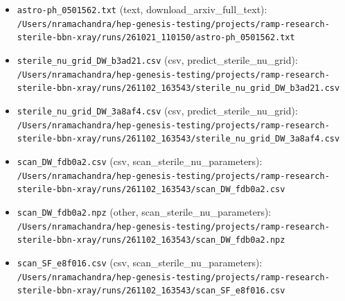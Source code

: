 \documentclass[11pt,a4paper]{article}
\begin{document}
\begin{itemize}
  \item \texttt{astro-ph\_\allowbreak{}0501562.txt} (text, download\_arxiv\_full\_text): \texttt{/\allowbreak{}Users/\allowbreak{}nramachandra/\allowbreak{}hep-genesis-testing/\allowbreak{}projects/\allowbreak{}ramp-research-sterile-bbn-xray/\allowbreak{}runs/\allowbreak{}261021\_\allowbreak{}110150/\allowbreak{}astro-ph\_\allowbreak{}0501562.txt}
  \item \texttt{sterile\_\allowbreak{}nu\_\allowbreak{}grid\_\allowbreak{}DW\_\allowbreak{}b3ad21.csv} (csv, predict\_sterile\_nu\_grid): \texttt{/\allowbreak{}Users/\allowbreak{}nramachandra/\allowbreak{}hep-genesis-testing/\allowbreak{}projects/\allowbreak{}ramp-research-sterile-bbn-xray/\allowbreak{}runs/\allowbreak{}261102\_\allowbreak{}163543/\allowbreak{}sterile\_\allowbreak{}nu\_\allowbreak{}grid\_\allowbreak{}DW\_\allowbreak{}b3ad21.csv}
  \item \texttt{sterile\_\allowbreak{}nu\_\allowbreak{}grid\_\allowbreak{}DW\_\allowbreak{}3a8af4.csv} (csv, predict\_sterile\_nu\_grid): \texttt{/\allowbreak{}Users/\allowbreak{}nramachandra/\allowbreak{}hep-genesis-testing/\allowbreak{}projects/\allowbreak{}ramp-research-sterile-bbn-xray/\allowbreak{}runs/\allowbreak{}261102\_\allowbreak{}163543/\allowbreak{}sterile\_\allowbreak{}nu\_\allowbreak{}grid\_\allowbreak{}DW\_\allowbreak{}3a8af4.csv}
  \item \texttt{scan\_\allowbreak{}DW\_\allowbreak{}fdb0a2.csv} (csv, scan\_sterile\_nu\_parameters): \texttt{/\allowbreak{}Users/\allowbreak{}nramachandra/\allowbreak{}hep-genesis-testing/\allowbreak{}projects/\allowbreak{}ramp-research-sterile-bbn-xray/\allowbreak{}runs/\allowbreak{}261102\_\allowbreak{}163543/\allowbreak{}scan\_\allowbreak{}DW\_\allowbreak{}fdb0a2.csv}
  \item \texttt{scan\_\allowbreak{}DW\_\allowbreak{}fdb0a2.npz} (other, scan\_sterile\_nu\_parameters): \texttt{/\allowbreak{}Users/\allowbreak{}nramachandra/\allowbreak{}hep-genesis-testing/\allowbreak{}projects/\allowbreak{}ramp-research-sterile-bbn-xray/\allowbreak{}runs/\allowbreak{}261102\_\allowbreak{}163543/\allowbreak{}scan\_\allowbreak{}DW\_\allowbreak{}fdb0a2.npz}
  \item \texttt{scan\_\allowbreak{}SF\_\allowbreak{}e8f016.csv} (csv, scan\_sterile\_nu\_parameters): \texttt{/\allowbreak{}Users/\allowbreak{}nramachandra/\allowbreak{}hep-genesis-testing/\allowbreak{}projects/\allowbreak{}ramp-research-sterile-bbn-xray/\allowbreak{}runs/\allowbreak{}261102\_\allowbreak{}163543/\allowbreak{}scan\_\allowbreak{}SF\_\allowbreak{}e8f016.csv}

\end{itemize}
\end{document}
